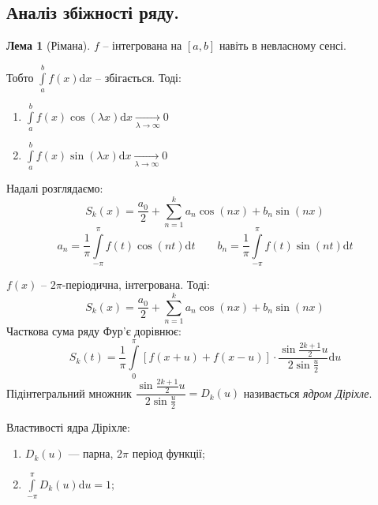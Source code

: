 \documentclass[a4paper]{scrartcl}
\theoremstyle{definition}
\newtheorem*{lemme}{Лема}
\theoremstyle{remark}
\theoremstyle{definition}
\theoremstyle{definition}
\begin{document}
\subsection{Аналіз збіжності ряду.}
\begin{lemme}[Рімана]
$f$ -- інтегрована на $[a,b]$ навіть в невласному сенсі. \par Тобто $ \int\limits_{a}^{b}{f(x) \mathrm{d} x}$ -- збігається. Тоді:
\begin{enumerate}
  \item $\displaystyle  \int\limits_{a}^{ b}{f(x) \cos{(\lambda x)} \mathrm{d} x } \xrightarrow[\lambda\to\infty]{} 0 $
    \item $\displaystyle  \int\limits_{a}^{ b}{f(x) \sin{(\lambda x)} \mathrm{d} x } \xrightarrow[\lambda\to\infty]{} 0 $
\end{enumerate}

\end{lemme}
Надалі розглядаємо:
$$
S_k(x) = \frac{a_0}{2} +  \sum\limits_{n =1}^{k}{ a_n\cos{(nx)} + b_n \sin{(nx)}}
$$
$$
a_n = \frac{1}{\pi}  \int\limits_{-\pi}^{\pi}{f(t) \cos{(nt)} \mathrm{d} t} \qquad b_n = \frac{1}{\pi}  \int\limits_{-\pi}^{ \pi}{f(t) \sin{(nt)} \mathrm{d} t}
$$
\begin{boxteo}
$f(x)$ -- $2\pi$-періодична, інтегрована. Тоді:
$$
S_k(x) = \frac{a_0}{2} +  \sum\limits_{n =1}^{k}{ a_n\cos{(nx)} + b_n \sin{(nx)}}
$$
Часткова сума ряду Фур'є дорівнює:
$$
S_k(t) = \frac{1}{\pi}  \int\limits_{0}^{\pi}{ \left[ f(x+u) + f(x-u) \right]\cdot \frac{\sin{ \frac{2k+1}{2} u }}{2 \sin \frac{u}{2} } \mathrm{d} u }
$$
Підінтегральний множник $\dfrac{\sin{ \frac{2k+1}{2} u }}{2 \sin \frac{u}{2} }= D_k(u)$  називається \textit{ядром Діріхле}.
\end{boxteo}
Властивості ядра Діріхле:
\begin{enumerate}
  \item $D_k(u)$ --- парна, $2 \pi$ період функції;
  \item $ \int\limits_{-\pi}^{\pi}{D_k(u) \mathrm{d} u} = 1 ;$
\end{enumerate}
\end{document}
